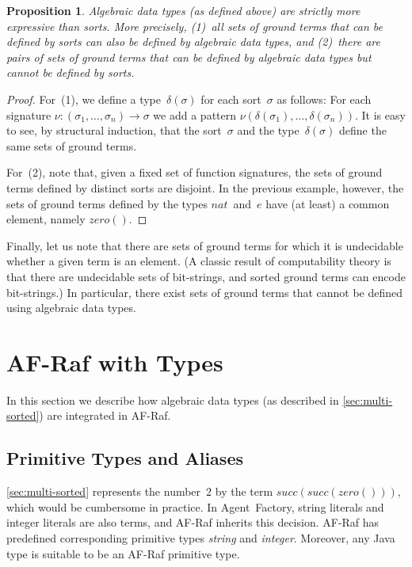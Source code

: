 \documentclass[preprint]{sigplanconf} %
\newtheorem{proposition}{Proposition}
\theoremstyle{remark}
\begin{document}
\begin{proposition}
Algebraic data types (as defined above) are strictly more expressive than
sorts. More precisely, (1)~all sets of ground terms that can be defined by
sorts can also be defined by algebraic data types, and (2)~there are pairs
of sets of ground terms that can be defined by algebraic data types but
cannot be defined by sorts.
\end{proposition}

\begin{proof}
For~(1), we define a type~$\delta(\sigma)$ for each sort~$\sigma$ as
follows: For each signature $\nu:(\sigma_1,\ldots,\sigma_n)\to\sigma$ we
add a pattern $\nu(\delta(\sigma_1),\ldots,\delta(\sigma_n))$. It is easy
to see, by structural induction, that the sort~$\sigma$ and the
type~$\delta(\sigma)$ define the same sets of ground terms.

For~(2), note that, given a fixed set of function signatures, the sets of
ground terms defined by distinct sorts are disjoint. In the previous
example, however, the sets of ground terms defined by the types
$\mathit{nat}$~and~$e$ have (at least) a common element, namely
$\mathit{zero}()$.
\end{proof}

Finally, let us note that there are sets of ground terms for which it is
undecidable whether a given term is an element.  (A classic result of
computability theory is that there are undecidable sets of bit-strings, and
sorted ground terms can encode bit-strings.) In particular, there exist
sets of ground terms that cannot be defined using algebraic data types.

\section{AF-Raf with Types} \label{sec:af-raf.types} %

In this section we describe how algebraic data types (as described in
\autoref{sec:multi-sorted}) are integrated in AF-Raf.

\subsection{Primitive Types and Aliases}

\autoref{sec:multi-sorted} represents the number~$2$ by the term
$\mathit{succ}(\mathit{succ}(\mathit{zero}()))$, which would be cumbersome
in practice. In Agent~Factory, string literals and integer literals are
also terms, and AF-Raf inherits this decision. AF-Raf has
predefined corresponding primitive types \textit{string} and
\textit{integer}. Moreover, any Java type is suitable to be an AF-Raf
primitive type.
\end{document}
